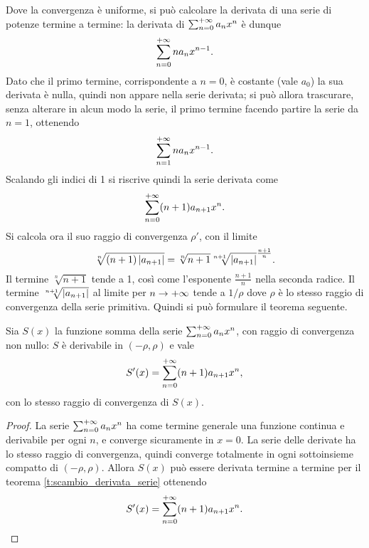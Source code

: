 Dove la convergenza è uniforme, si può calcolare la derivata di una serie di potenze termine a termine: la derivata di $\sum_{{n}=0}^{+\infty}a_nx^n$ è dunque
\[
\sum_{{n}=0}^{+\infty}na_nx^{n-1}.
\]
Dato che il primo termine, corrispondente a $n=0$, è costante (vale $a_0$) la sua derivata è nulla, quindi non appare nella serie derivata; si può allora trascurare, senza alterare in alcun modo la serie, il primo termine facendo partire la serie da $n=1$, ottenendo
\[
\sum_{{n}=1}^{+\infty}na_nx^{n-1}.
\]
Scalando gli indici di 1 si riscrive quindi la serie derivata come
\[
\sum_{{n}=0}^{+\infty}(n+1)a_{n+1}x^n.
\]
Si calcola ora il suo raggio di convergenza $\rho'$, con il limite
\[
\sqrt[n]{(n+1)\left|{a_{n+1}}\right|}=\sqrt[n]{n+1}\sqrt[n+1]{\left|{a_{n+1}}\right|}^{\frac{n+1}{n}}.
\]
Il termine $\sqrt[n]{n+1}$ tende a 1, così come l'esponente $\frac{n+1}{n}$ nella seconda radice. Il termine $\sqrt[n+1]{\left|{a_{n+1}}\right|}$ al limite per $n\to+\infty$ tende a $1/\rho$ dove $\rho$ è lo stesso raggio di convergenza della serie primitiva. Quindi si può formulare il teorema seguente.
\begin{teorema}
Sia $S(x)$ la funzione somma della serie $\sum_{{n}=0}^{+\infty}a_nx^n$, con raggio di convergenza non nullo: $S$ è derivabile in $(-\rho,\rho)$ e vale
\[
S'(x)=\sum_{{n}=0}^{+\infty}(n+1)a_{n+1}x^n,
\]
con lo stesso raggio di convergenza di $S(x)$.
\end{teorema}
\begin{proof}
La serie $\sum_{{n}=0}^{+\infty}a_nx^n$ ha come termine generale una funzione continua e derivabile per ogni $n$, e converge sicuramente in $x=0$. La serie delle derivate ha lo stesso raggio di convergenza, quindi converge totalmente in ogni sottoinsieme compatto di $(-\rho,\rho)$. Allora $S(x)$ può essere derivata termine a termine per il teorema \ref{t:scambio_derivata_serie} ottenendo
\[
S'(x)=\sum_{{n}=0}^{+\infty}(n+1)a_{n+1}x^n.\qedhere
\]
\end{proof}

